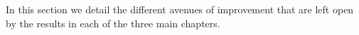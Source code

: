 In this section we detail the different avenues of improvement that are left open by the results in each of the three main chapters.